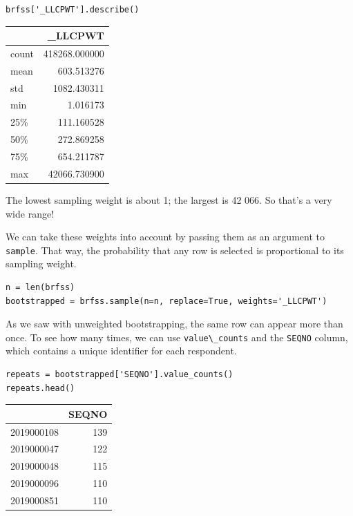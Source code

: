 \begin{lstlisting}[]
brfss['_LLCPWT'].describe()
\end{lstlisting}

\begin{tabular}{lr}
\midrule
{} &        \_LLCPWT \\
\midrule
count &  418268.000000 \\
mean  &     603.513276 \\
std   &    1082.430311 \\
min   &       1.016173 \\
25\%   &     111.160528 \\
50\%   &     272.869258 \\
75\%   &     654.211787 \\
max   &   42066.730900 \\
\midrule
\end{tabular}

The lowest sampling weight is about 1; the largest is 42 066. So that's
a very wide range!

We can take these weights into account by passing them as an argument to
\passthrough{\lstinline!sample!}. That way, the probability that any row
is selected is proportional to its sampling weight.

\begin{lstlisting}[]
n = len(brfss)
bootstrapped = brfss.sample(n=n, replace=True, weights='_LLCPWT')
\end{lstlisting}

As we saw with unweighted bootstrapping, the same row can appear more
than once. To see how many times, we can use
\passthrough{\lstinline!value\_counts!} and the
\passthrough{\lstinline!SEQNO!} column, which contains a unique
identifier for each respondent.

\begin{lstlisting}[]
repeats = bootstrapped['SEQNO'].value_counts()
repeats.head()
\end{lstlisting}

\begin{tabular}{lr}
\midrule
{} &  SEQNO \\
\midrule
2019000108 &    139 \\
2019000047 &    122 \\
2019000048 &    115 \\
2019000096 &    110 \\
2019000851 &    110 \\
\midrule
\end{tabular}

